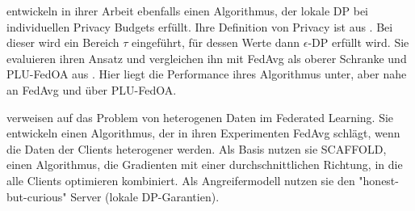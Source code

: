 \textcite{shen:2023} entwickeln in ihrer Arbeit ebenfalls einen Algorithmus, der lokale DP bei individuellen Privacy Budgets erfüllt. Ihre Definition von Privacy ist aus \textcite{chen:2016}. Bei dieser wird ein Bereich $\tau$ eingeführt, für dessen Werte dann $\epsilon$-DP erfüllt wird. Sie evaluieren ihren Ansatz und vergleichen ihn mit FedAvg \parencite{mcmahan:2016} als oberer Schranke und PLU-FedOA aus \textcite{yang:2021}. Hier liegt die Performance ihres Algorithmus unter, aber nahe an FedAvg und über PLU-FedOA.

\textcite{noble:2023} verweisen auf das Problem von heterogenen Daten im Federated Learning. Sie entwickeln einen Algorithmus, der in ihren Experimenten FedAvg schlägt, wenn die Daten der Clients heterogener werden. Als Basis nutzen sie SCAFFOLD, einen Algorithmus, die Gradienten mit einer durchschnittlichen Richtung, in die alle Clients optimieren kombiniert. Als Angreifermodell nutzen sie den "honest-but-curious" Server (lokale DP-Garantien). 
